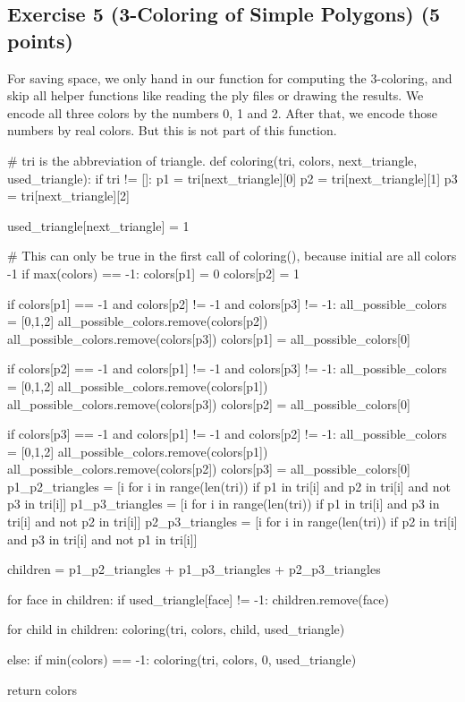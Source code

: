 \documentclass[english, fontsize=12pt, paper=a4, twoside=false, draft=true, pagesize=auto, version=last, DIV=16]{scrartcl}
\theoremstyle{break}
\begin{document}
\begin{landscape}
\section*{Exercise 5 (3-Coloring of Simple Polygons) {\large \hfill (5 points)}} 
For saving space, we only hand in our function for computing the 3-coloring, and skip all helper functions like reading the ply files or drawing the results. We encode all three colors by the numbers 0, 1 and 2. After that, we encode those numbers by real colors. But this is not part of this function. \par
\bigskip

\begin{python}
# tri is the abbreviation of triangle.
def coloring(tri, colors, next_triangle, used_triangle):
    if tri != []:
        p1 = tri[next_triangle][0]
        p2 = tri[next_triangle][1]
        p3 = tri[next_triangle][2]

        used_triangle[next_triangle] = 1

        # This can only be true in the first call of coloring(), because initial are all colors -1
        if max(colors) == -1:
            colors[p1] = 0
            colors[p2] = 1

        if colors[p1] == -1 and colors[p2] != -1 and colors[p3] != -1:
            all_possible_colors = [0,1,2]
            all_possible_colors.remove(colors[p2])
            all_possible_colors.remove(colors[p3])
            colors[p1] = all_possible_colors[0]

        if colors[p2] == -1 and colors[p1] != -1 and colors[p3] != -1:
            all_possible_colors = [0,1,2]
            all_possible_colors.remove(colors[p1])
            all_possible_colors.remove(colors[p3])
            colors[p2] = all_possible_colors[0]

        if colors[p3] == -1 and colors[p1] != -1 and colors[p2] != -1:
            all_possible_colors = [0,1,2]
            all_possible_colors.remove(colors[p1])
            all_possible_colors.remove(colors[p2])
            colors[p3] = all_possible_colors[0]
        p1_p2_triangles = [i for i in range(len(tri)) if p1 in tri[i] and p2 in tri[i] and not p3 in tri[i]]
        p1_p3_triangles = [i for i in range(len(tri)) if p1 in tri[i] and p3 in tri[i] and not p2 in tri[i]]
        p2_p3_triangles = [i for i in range(len(tri)) if p2 in tri[i] and p3 in tri[i] and not p1 in tri[i]]

        children = p1_p2_triangles + p1_p3_triangles + p2_p3_triangles

        for face in children:
            if used_triangle[face] != -1:
                children.remove(face)

        for child in children:
            coloring(tri, colors, child, used_triangle)

    else:
        if min(colors) == -1:
            coloring(tri, colors, 0, used_triangle)

    return colors
\end{python}
\end{landscape}
\newpage
\end{document}
